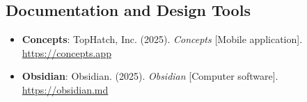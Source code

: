 \subsection*{Documentation and Design Tools}

\begin{itemize}[nosep]
	\item \textbf{Concepts}:  
	TopHatch, Inc. (2025). \textit{Concepts} [Mobile application]. 
	\\ \url{https://concepts.app}
	
	\item \textbf{Obsidian}:  
	Obsidian. (2025). \textit{Obsidian} [Computer software]. 
	\\ \url{https://obsidian.md}
\end{itemize}